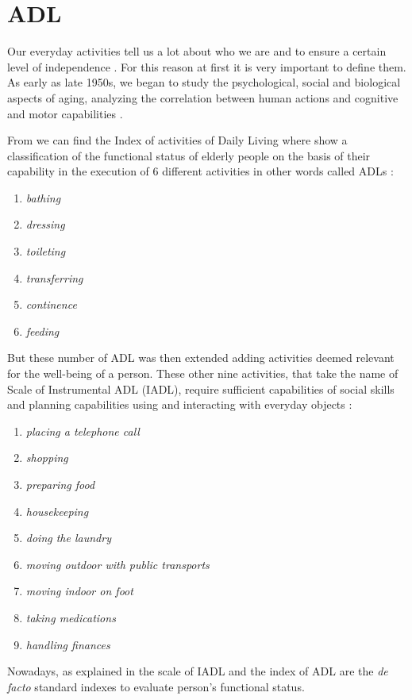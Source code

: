 \documentclass{thesisreport}
\begin{document}
\section{ADL}
Our everyday activities tell us a lot about who we are and to ensure a certain level of independence \cite{buoncompagni2017towards}. For this reason at first it is very important to define them. As early as late 1950s, we began to study the psychological, social and biological aspects of aging, analyzing the correlation between human actions and cognitive and motor capabilities \cite{buoncompagni2017towards}. 

From \cite{Multidisciplinary} we can find the Index of activities of Daily Living where show a classification of the functional status of elderly people on the basis of their capability in the execution of 6 different activities in other words called ADLs \cite{buoncompagni2017towards}:
\begin{enumerate}
    \item \textit{bathing}
    \item \textit{dressing}
    \item \textit{toileting}
    \item \textit{transferring}
    \item \textit{continence}
    \item \textit{feeding}
\end{enumerate}

But these number of ADL was then extended adding activities deemed relevant for the well-being of a person. These other nine activities, that take the name of Scale of Instrumental ADL \cite{lawton1970assessment} (IADL), require sufficient capabilities of social skills and planning capabilities using and interacting with everyday objects \cite{buoncompagni2017towards}:
\begin{enumerate}
    \item \textit{placing a telephone call}
    \item \textit{shopping}
    \item \textit{preparing food}
    \item \textit{housekeeping}
    \item \textit{doing the laundry}
    \item \textit{moving outdoor with public transports}
    \item \textit{moving indoor on foot}
    \item \textit{taking medications}
    \item \textit{handling finances}
\end{enumerate}
Nowadays, as explained in \cite{bruno2014public} the scale of IADL and the index of ADL are the \textit{de facto} standard indexes to evaluate person’s functional status\cite{buoncompagni2017towards}. 
\end{document}
